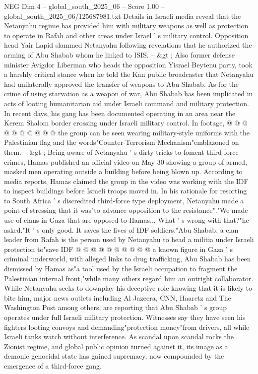 \begin{textsample}{NEG Dim 4 – global\_south\_2025\_06 – Score 1.00 – global\_south\_2025\_06/125687981.txt}
Details in Israeli media reveal that the Netanyahu regime has provided him with military weapons as well as protection to operate in Rafah and other areas under Israel ' s military control.
Opposition head Yair Lapid slammed Netanyahu following revelations that he authorized the arming of Abu Shabab whom he linked to ISIS. -- \&gt ; Also former defense minister Avigdor Liberman who heads the opposition Yisrael Beytenu party, took a harshly critical stance when he told the Kan public broadcaster that Netanyahu had unilaterally approved the transfer of weapons to Abu Shabab.
As for the crime of using starvation as a weapon of war, Abu Shabab has been implicated in acts of looting humanitarian aid under Israeli command and military protection.
In recent days, his gang has been documented operating in an area near the Kerem Shalom border crossing under Israeli military control.
In footage, @ @ @ @ @ @ @ @ @ @ the group can be seen wearing military-style uniforms with the Palestinian flag and the words"Counter-Terrorism Mechanism"emblazoned on them. -- \&gt ; Being aware of Netanyahu ' s dirty tricks to foment third-force crimes, Hamas published an official video on May 30 showing a group of armed, masked men operating outside a building before being blown up.
According to media reports, Hamas claimed the group in the video was working with the IDF to inspect buildings before Israeli troops moved in.
In his rationale for resorting to South Africa ' s discredited third-force type deployment, Netanyahu made a point of stressing that it was"to advance opposition to the resistance"."We made use of clans in Gaza that are opposed to Hamas...
What ' s wrong with that?"he asked."It ' s only good.
It saves the lives of IDF soldiers."Abu Shabab, a clan leader from Rafah is the person used by Netanyahu to head a militia under Israeli protection to"save IDF @ @ @ @ @ @ @ @ @ @ a known figure in Gaza ' s criminal underworld, with alleged links to drug trafficking, Abu Shabab has been dismissed by Hamas as"a tool used by the Israeli occupation to fragment the Palestinian internal front,"while many others regard him an outright collaborator.
While Netanyahu seeks to downplay his deceptive role knowing that it is likely to bite him, major news outlets including Al Jazeera, CNN, Haaretz and The Washington Post among others, are reporting that Abu Shabab ' s group operates under full Israeli military protection.
Witnesses say they have seen his fighters looting convoys and demanding"protection money"from drivers, all while Israeli tanks watch without interference.
As scandal upon scandal rocks the Zionist regime, and global public opinion turned against it, its image as a demonic genocidal state has gained supremacy, now compounded by the emergence of a third-force gang.

\end{textsample}
